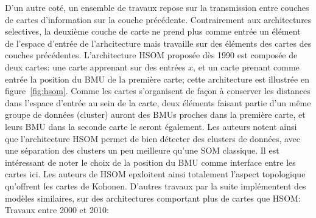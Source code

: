 \documentclass[../main]{subfiles}
\begin{document}
D'un autre coté, un ensemble de travaux repose sur la transmission entre couches de cartes d'information sur la couche précédente. Contrairement aux architectures selectives, la deuxième couche de carte ne prend plus comme entrée un élément de l'espace d'entrée de l'arhcitecture mais travaille sur des éléments des cartes des couches précédentes. L'architecture  HSOM \cite{lampinen_clustering_1992} proposée dès 1990 est composée de deux cartes: une carte apprenant sur des entrées $x$, et un carte prenant comme entrée la position du BMU de la première carte; cette architecture est illustrée en figure~\ref{fig:hsom}.
Comme les cartes s'organisent de façon à conserver les distances dans l'espace d'entrée au sein de la carte, deux éléments faisant partie d'un même groupe de données (cluster) auront des BMUs proches dans la première carte, et leurs BMU dans la seconde carte le seront également. Les auteurs notent ainsi que l'architecture HSOM permet de bien détecter des clusters de données, avec une séparation des clusters un peu meilleure qu'une SOM classique.
Il est intéressant de noter le choix de la position du BMU comme interface entre les cartes ici. Les auteurs de HSOM epxloitent ainsi totalement l'aspect topologique qu'offrent les cartes de Kohonen. D'autres travaux par la suite implémentent des modèles similaires, sur des architectures comportant plus de cartes que HSOM: \cite{hagenauer_hierarchical_2013}
Travaux entre 2000 et 2010:
\cite{dittenbach_growing_2000,yamaguchi_adaptive_2010,gunes_kayacik_hierarchical_2007,wang_comparisonal_2007}
\end{document}
